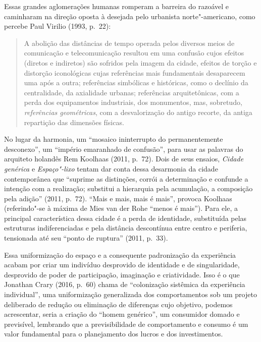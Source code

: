 Essas grandes aglomerações humanas romperam a barreira do razoável e
caminharam na direção oposta à desejada pelo urbanista norte"-americano,
como percebe Paul Virilio (1993, p.~22):

\begin{quote}
A abolição das distâncias de tempo operada pelos diversos meios de
comunicação e telecomunicação resultou em uma confusão cujos efeitos
(diretos e indiretos) são sofridos pela imagem da cidade, efeitos de
torção e distorção iconológicas cujas referências mais fundamentais
desaparecem uma após a outra; referências simbólicas e históricas, como
o declínio da centralidade, da axialidade urbanas; referências
arquitetônicas, com a perda dos equipamentos industriais, dos
monumentos, mas, sobretudo, \emph{referências geométricas}, com a
desvalorização do antigo recorte, da antiga repartição das dimensões
físicas.
\end{quote}

No lugar da harmonia, um ``mosaico ininterrupto do permanentemente
desconexo'', um ``império emaranhado de confusão'', para usar as
palavras do arquiteto holandês Rem Koolhaas (2011, p.~72).
Dois de seus ensaios, \emph{Cidade genérica} e \emph{Espaço"-lixo} tentam
dar conta dessa desarmonia da cidade contemporânea que ``suprime as
distinções, corrói a determinação e confunde a intenção com a
realização; substitui a hierarquia pela acumulação, a composição pela
adição'' (2011, p.~72). ``Mais e mais, mais é mais'', provoca Koolhaas
(referindo"-se à máxima de Mies van der Rohe ``menos é mais''). Para ele, a principal característica dessa cidade é a perda de
identidade, substituída pelas estruturas indiferenciadas e pela
distância descontínua entre centro e periferia, tensionada até seu
``ponto de ruptura'' (2011, p.~33).

Essa uniformização do espaço e a consequente padronização da experiência
acabam por criar um indivíduo desprovido de identidade e de
singularidade, desprovido de poder de participação, imaginação e
criatividade. Isso é o que Jonathan Crary (2016, p.~60) chama de
``colonização sistêmica da experiência individual'', uma uniformização
generalizada dos comportamentos sob um projeto deliberado de redução ou
eliminação de diferenças cujo objetivo, podemos acrescentar, seria a
criação do ``homem genérico'', um consumidor domado e previsível,
lembrando que a previsibilidade de comportamento e consumo é um valor
fundamental para o planejamento dos lucros e dos investimentos.

